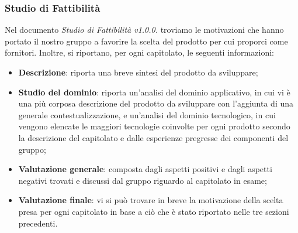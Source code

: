 \subsubsection{Studio di Fattibilità}
Nel documento \emph{Studio di Fattibilità v1.0.0.} troviamo le motivazioni che hanno portato il nostro gruppo a favorire la scelta del prodotto per cui proporci come fornitori. Inoltre, si riportano, per ogni capitolato, le seguenti informazioni:
\begin{itemize}
 	\item\textbf{{Descrizione}}: riporta una breve sintesi del prodotto da sviluppare;
 	\item\textbf{{Studio del dominio}}: riporta un'analisi del dominio applicativo, in cui vi è una più corposa descrizione del prodotto da sviluppare con l'aggiunta di una generale contestualizzazione, e un'analisi del dominio tecnologico, in cui vengono elencate le maggiori tecnologie coinvolte per ogni prodotto secondo la descrizione del capitolato e dalle esperienze pregresse dei componenti del gruppo;
 	\item\textbf{{Valutazione generale}}: composta dagli aspetti positivi e dagli aspetti negativi trovati e discussi dal gruppo riguardo al capitolato in esame;
 	\item\textbf{{Valutazione finale}}: vi si può trovare in breve la motivazione della scelta presa per ogni capitolato in base a ciò che è stato riportato nelle tre sezioni precedenti.
\end{itemize}

